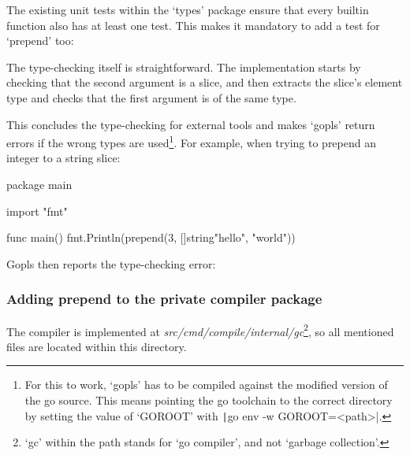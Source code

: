 The existing unit tests within the `types' package ensure that every builtin
function also has at least one test. This makes it mandatory to add a test
for `prepend' too:

\begin{code}
\end{code}

The type-checking itself is straightforward. The implementation starts by checking that the second
argument is a slice, and then extracts the slice's element type and checks that the first argument
is of the same type.

\begin{code}
\end{code}

This concludes the type-checking for external tools and makes `gopls' return errors
if the wrong types are used\footnote{
For this to work, `gopls' has to be compiled against the modified version of the
go source. This means pointing the go toolchain to the correct directory by setting
the value of `GOROOT' with \texttt|go env -w GOROOT=<path>|.
}. For example, when trying to prepend an integer to
a string slice:

\begin{gocode}
package main

import "fmt"

func main() {
    fmt.Println(prepend(3, []string{"hello", "world"}))
}
\end{gocode}

Gopls then reports the type-checking error:

\subsubsection{Adding prepend to the private compiler package}

The compiler is implemented at \textit{src/cmd/compile/internal/gc}\footnote{`gc'
within the path stands for `go compiler', and not `garbage collection'.},
so all mentioned files are located within this directory.

